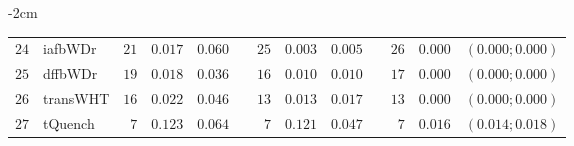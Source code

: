 \begin{table*}[!htbp]
\begin{adjustwidth*}{}{-2cm}
\begin{tabular}{@{}rlrrrrrrrrrcc@{}}
\footnotesize{$24$} & \footnotesize{iafbWDr  } & \footnotesize{$21$} & \footnotesize{$0.017$} & \footnotesize{$0.060$} && \footnotesize{$25$} & \footnotesize{$0.003$} & \footnotesize{$0.005$} && \footnotesize{$26$} & \footnotesize{$0.000$} & \footnotesize{$(0.000;0.000)$} \\
\footnotesize{$25$} & \footnotesize{dffbWDr  } & \footnotesize{$19$} & \footnotesize{$0.018$} & \footnotesize{$0.036$} && \footnotesize{$16$} & \footnotesize{$0.010$} & \footnotesize{$0.010$} && \footnotesize{$17$} & \footnotesize{$0.000$} & \footnotesize{$(0.000;0.000)$} \\
\footnotesize{$26$} & \footnotesize{transWHT } & \footnotesize{$16$} & \footnotesize{$0.022$} & \footnotesize{$0.046$} && \footnotesize{$13$} & \footnotesize{$0.013$} & \footnotesize{$0.017$} && \footnotesize{$13$} & \footnotesize{$0.000$} & \footnotesize{$(0.000;0.000)$} \\
\footnotesize{$27$} & \footnotesize{tQuench  } & \footnotesize{$7 $} & \footnotesize{$0.123$} & \footnotesize{$0.064$} && \footnotesize{$7 $} & \footnotesize{$0.121$} & \footnotesize{$0.047$} && \footnotesize{$7 $} & \footnotesize{$0.016$} & \footnotesize{$(0.014;0.018)$} \\
\bottomrule
\end{tabular}
\end{adjustwidth*}
\end{table*}
